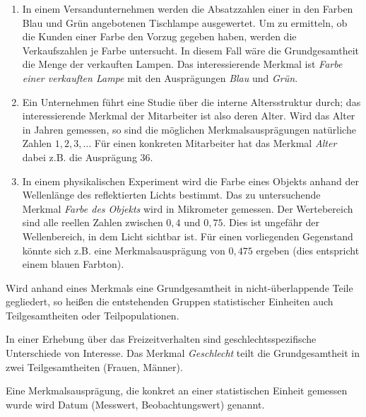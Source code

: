 \documentclass{lecture}
\begin{document}
    \begin{example}
        \begin{enumerate}
            \item In einem Versandunternehmen werden die Absatzzahlen einer in den Farben Blau und Grün angebotenen Tischlampe ausgewertet.
            Um zu ermitteln, ob die Kunden einer Farbe den Vorzug gegeben haben, werden die Verkaufszahlen je Farbe untersucht.
            In diesem Fall wäre die Grundgesamtheit die Menge der verkauften Lampen.
            Das interessierende Merkmal ist \emph{Farbe einer verkauften Lampe} mit den Ausprägungen \emph{Blau} und \emph{Grün}.
            \item Ein Unternehmen führt eine Studie über die interne Altersstruktur durch; das interessierende Merkmal der Mitarbeiter ist also deren Alter.
            Wird das Alter in Jahren gemessen, so sind die möglichen Merkmalsausprägungen natürliche Zahlen \(1, 2, 3, \ldots\)
            Für einen konkreten Mitarbeiter hat das Merkmal \emph{Alter} dabei z.B. die Ausprägung \(36\).
            \item In einem physikalischen Experiment wird die Farbe eines Objekts anhand der Wellenlänge des reflektierten Lichts bestimmt.
            Das zu untersuchende Merkmal \emph{Farbe des Objekts} wird in Mikrometer gemessen.
            Der Wertebereich sind alle reellen Zahlen zwischen \(0,4\) und \(0,75\).
            Dies ist ungefähr der Wellenbereich, in dem Licht sichtbar ist.
            Für einen vorliegenden Gegenstand könnte sich z.B. eine Merkmalsausprägung von \(0,475\) ergeben (dies entspricht einem blauen Farbton).
        \end{enumerate}
    \end{example}

    Wird anhand eines Merkmals eine Grundgesamtheit in nicht-überlappende Teile gegliedert, so heißen die entstehenden Gruppen statistischer Einheiten auch Teilgesamtheiten oder Teilpopulationen.

    \begin{example}
        In einer Erhebung über das Freizeitverhalten sind geschlechtsspezifische Unterschiede von Interesse.
        Das Merkmal \emph{Geschlecht} teilt die Grundgesamtheit in zwei Teilgesamtheiten (Frauen, Männer).
    \end{example}

    Eine Merkmalsausprägung, die konkret an einer statistischen Einheit gemessen wurde wird Datum (Messwert, Beobachtungswert) genannt.
\end{document}
